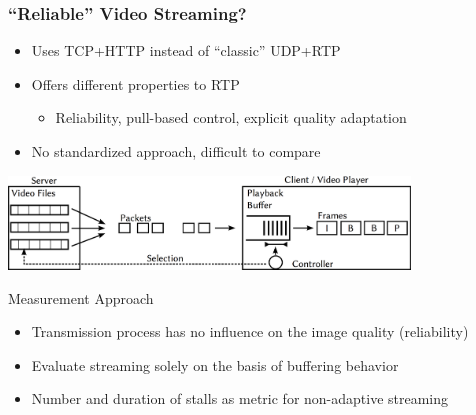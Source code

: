 \documentclass{beamer}
\begin{document}
\begin{frame}
	\frametitle{``Reliable'' Video Streaming?}

	\begin{itemize}
		\item Uses TCP+HTTP instead of ``classic'' UDP+RTP
		\item Offers different properties to RTP
		\begin{itemize}
			\item Reliability, pull-based control, explicit quality adaptation
		\end{itemize}
		\item No standardized approach, difficult to compare
	\end{itemize}

	\begin{center}
		\includegraphics[height=2.5cm]{extras/playback-model.png}
	\end{center}


	\pause
	\begin{block}{Measurement Approach}
	\begin{itemize}
		\item Transmission process has no influence on the image quality (reliability)
		\item Evaluate streaming solely on the basis of buffering behavior
		\item Number and duration of stalls as metric for non-adaptive streaming
	\end{itemize}
	\end{block}

\end{frame}
\end{document}
